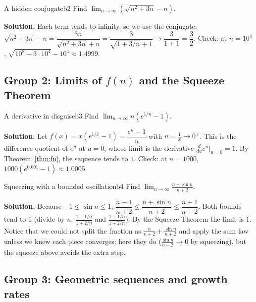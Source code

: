 \documentclass[11pt]{article}
\begin{document}
\begin{exmp}{A hidden conjugate}{b2}
Find $\displaystyle\lim_{n\to\infty}\left(\sqrt{n^2+3n}-n\right)$.

\textbf{Solution.} Each term tends to infinity, so we use the conjugate: $\sqrt{n^2+3n}-n=\dfrac{3n}{\sqrt{n^2+3n}+n}=\dfrac3{\sqrt{1+3/n}+1}\to\dfrac3{1+1}=\dfrac32$. Check: at $n=10^4$, $\sqrt{10^8+3\cdot10^4}-10^4\approx1.4999$.
\end{exmp}

\subsection*{Group 2: Limits of $f(n)$ and the Squeeze Theorem}

\begin{exmp}{A derivative in disguise}{b3}
Find $\displaystyle\lim_{n\to\infty}n\left(e^{1/n}-1\right)$.

\textbf{Solution.} Let $f(x)=x\left(e^{1/x}-1\right)=\dfrac{e^{u}-1}{u}$ with $u=\frac1x\to0^+$. This is the difference quotient of $e^u$ at $u=0$, whose limit is the derivative $\frac{d}{du}e^u\big|_{u=0}=1$. By Theorem~\ref{thm:fn}, the sequence tends to $1$. Check: at $n=1000$, $1000\left(e^{0.001}-1\right)\approx1.0005$.
\end{exmp}

\begin{exmp}{Squeezing with a bounded oscillation}{b4}
Find $\displaystyle\lim_{n\to\infty}\frac{n+\sin n}{n+2}$.

\textbf{Solution.} Because $-1\le\sin n\le1$, $\dfrac{n-1}{n+2}\le\dfrac{n+\sin n}{n+2}\le\dfrac{n+1}{n+2}$. Both bounds tend to $1$ (divide by $n$: $\frac{1-1/n}{1+2/n}$ and $\frac{1+1/n}{1+2/n}$). By the Squeeze Theorem the limit is $1$.
Notice that we could not split the fraction as $\frac{n}{n+2}+\frac{\sin n}{n+2}$ and apply the sum law unless we knew each piece converges; here they do ($\frac{\sin n}{n+2}\to0$ by squeezing), but the squeeze above avoids the extra step.
\end{exmp}

\subsection*{Group 3: Geometric sequences and growth rates}
\end{document}

